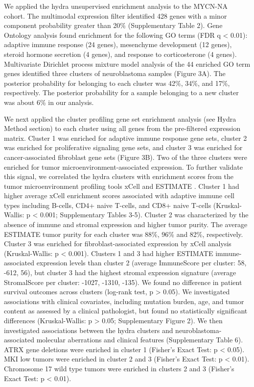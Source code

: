 \documentclass[10pt,letterpaper]{article}
\begin{document}
We applied the hydra unsupervised enrichment analysis to the MYCN-NA cohort. The multimodal expression filter identified 428 genes with a minor component probability greater than 20\% (Supplementary Table 2). Gene Ontology analysis found enrichment for the following GO terms (FDR q < 0.01): adaptive immune response (24 genes), mesenchyme development (12 genes), steroid hormone secretion (4 genes), and response to corticosterone (4 genes). Multivariate Dirichlet process mixture model analysis of the 44 enriched GO term genes identified three clusters of neuroblastoma samples (Figure 3A). The posterior probability for belonging to each cluster was 42\%, 34\%, and 17\%, respectively. The posterior probability for a sample belonging to a new cluster was about 6\% in our analysis. 

We next applied the cluster profiling gene set enrichment analysis (see Hydra Method section) to each cluster using all genes from the pre-filtered expression matrix. Cluster 1 was enriched for adaptive immune response gene sets, cluster 2 was enriched for proliferative signaling gene sets, and cluster 3 was enriched for cancer-associated fibroblast gene sets (Figure 3B). Two of the three clusters were enriched for tumor microenvironment-associated expression. To further validate this signal, we correlated the hydra clusters with enrichment scores from the tumor microenvironment profiling tools xCell \cite{aranXCellDigitallyPortraying2017} and ESTIMATE \cite{yoshiharaInferringTumourPurity2013a}. Cluster 1 had higher average xCell enrichment scores associated with adaptive immune cell types including B-cells, CD4+ naive T-cells, and CD8+ naive T-cells (Kruskal-Wallis: p < 0.001; Supplementary Tables 3-5). Cluster 2 was characterized by the absence of immune and stromal expression and higher tumor purity. The average ESTIMATE tumor purity for each cluster was 88\%, 96\% and 82\%, respectively. Cluster 3 was enriched for fibroblast-associated expression by xCell analysis (Kruskal-Wallis: p < 0.001). Clusters 1 and 3 had higher ESTIMATE immune-associated expression levels than cluster 2 (average ImmuneScore per cluster: 58, -612, 56), but cluster 3 had the highest stromal expression signature (average StromalScore per cluster: -1027, -1310, -135). We found no difference in patient survival outcomes across clusters (log-rank test, p > 0.05). We investigated associations with clinical covariates, including mutation burden, age, and tumor content as assessed by a clinical pathologist, but found no statistically significant differences (Kruskal-Wallis: p > 0.05; Supplementary Figure 2). We then investigated associations between the hydra clusters and neuroblastoma-associated molecular aberrations and clinical features (Supplementary Table 6). ATRX gene deletions were enriched in cluster 1 (Fisher’s Exact Test: p < 0.05). MKI low tumors were enriched in cluster 2 and 3 (Fisher’s Exact Test: p < 0.01). Chromosome 17 wild type tumors were enriched in clusters 2 and 3 (Fisher’s Exact Test: p < 0.01).
\end{document}
